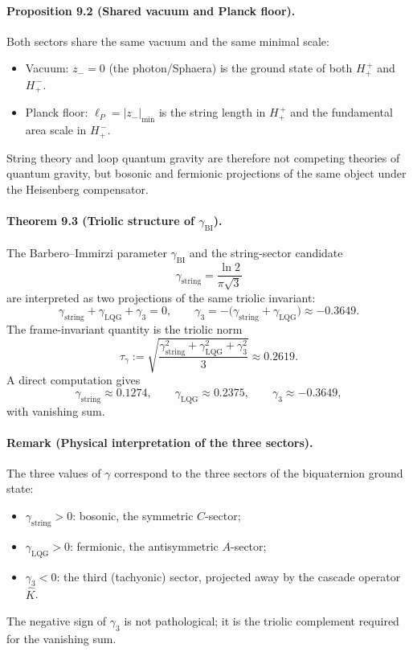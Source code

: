 \documentclass[12pt,a4paper]{article}
\begin{document}
\paragraph*{Proposition 9.2 (Shared vacuum and Planck floor).}
Both sectors share the same vacuum and the same minimal scale:
\begin{itemize}
  \item Vacuum: $z_-=0$ (the photon/Sphaera) is the ground state of both $H_+^{\,+}$ and $H_+^{\,-}$.
  \item Planck floor: $\ell_P = |z_-|_{\min}$ is the string length in $H_+^{\,+}$ and the fundamental area scale in $H_+^{\,-}$.
\end{itemize}
String theory and loop quantum gravity are therefore not competing theories of quantum gravity, but bosonic and fermionic projections of the same object under the Heisenberg compensator.

\paragraph*{Theorem 9.3 (Triolic structure of $\gamma_{\mathrm{BI}}$).}
The Barbero--Immirzi parameter $\gamma_{\mathrm{BI}}$ and the string-sector candidate
\[
\gamma_{\mathrm{string}} = \frac{\ln 2}{\pi\sqrt{3}}
\]
are interpreted as two projections of the same triolic invariant:
\[
\gamma_{\mathrm{string}} + \gamma_{\mathrm{LQG}} + \gamma_3 = 0,
\qquad
\gamma_3 = -\bigl(\gamma_{\mathrm{string}} + \gamma_{\mathrm{LQG}}\bigr) \approx -0.3649.
\]
The frame-invariant quantity is the triolic norm
\[
\tau_\gamma := \sqrt{\frac{\gamma_{\mathrm{string}}^2 + \gamma_{\mathrm{LQG}}^2 + \gamma_3^2}{3}} \approx 0.2619.
\]
A direct computation gives
\[
\gamma_{\mathrm{string}} \approx 0.1274, \qquad \gamma_{\mathrm{LQG}} \approx 0.2375, \qquad \gamma_3 \approx -0.3649,
\]
with vanishing sum.

\paragraph*{Remark (Physical interpretation of the three sectors).}
The three values of $\gamma$ correspond to the three sectors of the biquaternion ground state:
\begin{itemize}
  \item $\gamma_{\mathrm{string}} > 0$: bosonic, the symmetric $C$-sector;
  \item $\gamma_{\mathrm{LQG}} > 0$: fermionic, the antisymmetric $A$-sector;
  \item $\gamma_3 < 0$: the third (tachyonic) sector, projected away by the cascade operator $\hat K$.
\end{itemize}
The negative sign of $\gamma_3$ is not pathological; it is the triolic complement required for the vanishing sum.
\end{document}
